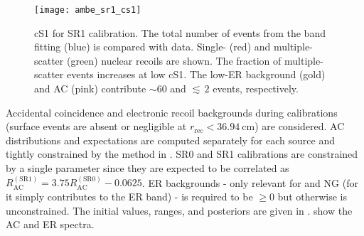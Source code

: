 \begin{figure}
\centering
\texttt{[image: ambe\_sr1\_cs1]}
\caption[cS1 for SR1 \ambe calibration.  The total number of events agrees reasonably well with the data.  Single- and
multiple-scatter neutrons, electronic recoils, and AC are shown.]{cS1 for SR1 \ambe calibration.  The total number of events from the band
fitting (blue) is compared with data.  Single- (red)
and multiple-scatter (green) nuclear recoils are shown.  The fraction of multiple-scatter events increases at low cS1.  The low-ER
background (gold) and AC (pink) contribute ${\sim}60$ and ${\lesssim}\, 2$ events, respectively.}
\label{fig:er_nr_calibrations_results_ambe_sr1_cs1}
\end{figure}

Accidental coincidence and electronic recoil backgrounds during calibrations (surface events are absent or negligible at
$r_{\mathrm{rec}} < 36.94\ \mathrm{cm}$) are considered.  AC
distributions and expectations are computed separately for each source and tightly constrained by the method in
.  SR0 and SR1  calibrations are constrained by a
single parameter since they are expected to be correlated as
$R_{\mathrm{AC}}^{\mathrm{(SR1)}} = 3.75 R_{\mathrm{AC}}^{\mathrm{(SR0)}} - 0.0625$.  ER backgrounds - only relevant for
\ambe and NG
(for  it simply contributes to the ER band) - is required to be $\geq 0$ but otherwise is unconstrained.  The initial values,
ranges, and posteriors are given in
.  
show the AC and ER spectra.

